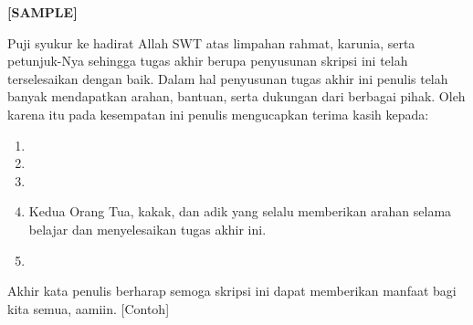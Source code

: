 \begin{center}
	\textbf{[SAMPLE]}
\end{center}

Puji syukur ke hadirat Allah SWT atas limpahan rahmat, karunia, serta petunjuk-Nya sehingga tugas akhir berupa penyusunan skripsi ini telah terselesaikan dengan baik. Dalam hal penyusunan tugas akhir ini penulis telah banyak mendapatkan arahan, bantuan, serta dukungan dari berbagai pihak. Oleh karena itu pada kesempatan ini penulis mengucapkan terima kasih kepada:

\begin{enumerate}
	\item <isi dengan nama Kadep>
	
	\item <isi dengan nama Sekdep>
	
	\item <isi dengan nama Dosen Pembimbing>
	
	\item Kedua Orang Tua, kakak, dan adik yang selalu memberikan arahan selama belajar dan menyelesaikan tugas akhir ini. 
	
	\item <isi dengan nama orang lainnya>

\end{enumerate}

Akhir kata penulis berharap semoga skripsi ini dapat memberikan manfaat bagi kita semua, aamiin. [Contoh]

